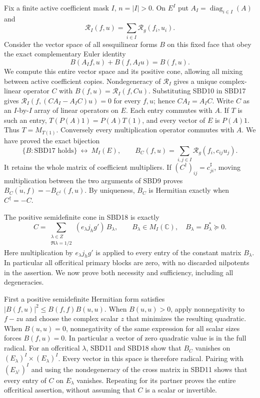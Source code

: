 Fix a finite active coefficient mask $I$, $n=|I|>0$. On $E^I$
put $A_I=\operatorname{diag}_{i\in I}(A)$ and
\[
 \mathcal R_I(f,u)=\sum_{i\in I}\mathcal R_g(f_i,u_i).
 \tag{SBD16}
\]
Consider the vector space of all sesquilinear forms $B$ on
this fixed face that obey the exact complementary Euler identity
\[
 B(A_If,u)+B(f,A_Iu)=B(f,u).
 \tag{SBD17}
\]
We compute this entire vector space and its positive cone, allowing
all mixing between active coefficient copies. Nondegeneracy of
$\mathcal R_I$ gives a unique complex-linear operator $C$ with
$B(f,u)=\mathcal R_I(f,Cu)$. Substituting SBD10 in SBD17 gives
$\mathcal R_I(f,(CA_I-A_IC)u)=0$ for every $f,u$;
hence $CA_I=A_IC$. Write $C$ as an $I$-by-$I$ array of linear
operators on $E$. Each entry commutes with $A$. If $T$ is
such an entry, $T(P(A)1)=P(A)T(1)$, and every vector of $E$
is $P(A)1$. Thus $T=M_{T(1)}$. Conversely every multiplication
operator commutes with $A$. We have proved the exact bijection
\[
 \{B:\text{SBD17 holds}\}\ \longleftrightarrow\ M_I(E),
 \qquad B_C(f,u)=\sum_{i,j\in I}\mathcal R_g(f_i,c_{ij}u_j).
 \tag{SBD18}
\]
It retains the whole matrix of coefficient multipliers.
If $(C^\dagger)_{ij}=c_{ji}^\sharp$, moving multiplication
between the two arguments of SBD9 proves
$\overline{B_C(u,f)}=-B_{C^\dagger}(f,u)$. By uniqueness,
$B_C$ is Hermitian exactly when $C^\dagger=-C$.

The positive semidefinite cone in SBD18 is exactly
\[
 \boxed{\quad
 C=\sum_{\substack{\lambda\in Z\\\Re\lambda=1/2}}
           (e_\lambda j_hg')\,B_\lambda,
 \qquad B_\lambda\in M_I(\mathbb C),\quad B_\lambda=B_\lambda^*\succeq0.
 \quad}
 \tag{SBD19}
\]
Here multiplication by $e_\lambda j_hg'$ is applied to every
entry of the constant matrix $B_\lambda$. In particular all
offcritical primary blocks are zero, with no discarded
nilpotents in the assertion. We now prove both necessity and
sufficiency, including all degeneracies.

First a positive semidefinite Hermitian form satisfies
$|B(f,u)|^2\leq B(f,f)B(u,u)$. When $B(u,u)>0$, apply
nonnegativity to $f-z u$ and choose the complex scalar $z$
that minimizes the resulting quadratic. When $B(u,u)=0$,
nonnegativity of the same expression for all scalar sizes
forces $B(f,u)=0$. In particular a vector of zero quadratic
value is in the full radical.
For an offcritical $\lambda$, SBD11 and SBD18 show that
$B_C$ vanishes on $(E_\lambda)^I\times(E_\lambda)^I$.
Every vector in this space is therefore radical. Pairing with
$(E_{\lambda^\dagger})^I$ and using the nondegeneracy of
the cross matrix in SBD11 shows that every entry of $C$
on $E_\lambda$ vanishes. Repeating for its partner proves
the entire offcritical assertion, without assuming that $C$
is a scalar or invertible.


